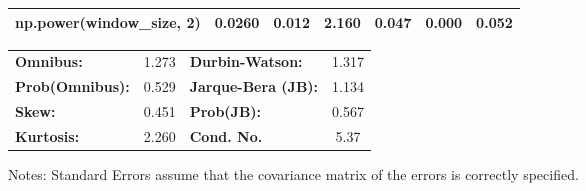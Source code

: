 \begin{center}
\begin{tabular}{lcccccc}
\textbf{np.power(window\_size, 2)}            &       0.0260  &        0.012     &     2.160  &         0.047        &        0.000    &        0.052     \\
\bottomrule
\end{tabular}
\begin{tabular}{lclc}
\textbf{Omnibus:}       &  1.273 & \textbf{  Durbin-Watson:     } &    1.317  \\
\textbf{Prob(Omnibus):} &  0.529 & \textbf{  Jarque-Bera (JB):  } &    1.134  \\
\textbf{Skew:}          &  0.451 & \textbf{  Prob(JB):          } &    0.567  \\
\textbf{Kurtosis:}      &  2.260 & \textbf{  Cond. No.          } &     5.37  \\
\bottomrule
\end{tabular}
\end{center}

Notes: \newline
 [1] Standard Errors assume that the covariance matrix of the errors is correctly specified.